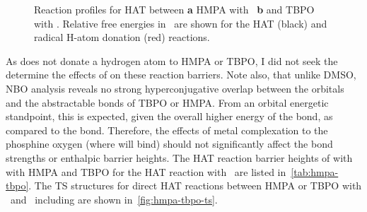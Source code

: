 \begin{figure}[!htbp]
  \setcounter{subfigure}{0}
  \centering

  \caption[Reaction profiles for HAT between HMPA with \bno\, and TBPO with
  \bno.]{Reaction profiles for HAT between \textbf{a} HMPA with \bno\,
  \textbf{b} and TBPO with \bno. Relative free energies in \kcalmol\ are shown
  for the HAT (black) and radical H-atom donation (red) reactions.}
  \label{fig:hmpa-tbpo-bno}
\end{figure}


As \bno does not donate a hydrogen atom to HMPA or TBPO, I did not seek the
determine the effects of  on these reaction barriers. Note also, that
unlike DMSO, NBO analysis reveals no strong hyperconjugative overlap between the
 orbitals and the abstractable  bonds of TBPO or HMPA. From an
orbital energetic standpoint, this is expected, given the overall higher energy
of the  bond, as compared to the  bond. Therefore, the effects
of metal complexation to the phosphine oxygen (where  will bind) should
not significantly affect the  bond strengths or enthalpic barrier
heights. The HAT reaction barrier heights of  with with HMPA and TBPO
for the HAT reaction with \cumo\ are listed in~\ref{tab:hmpa-tbpo}. The TS
structures for direct HAT reactions between HMPA or TBPO with \cumo\ and \bno\
including  are shown in~\ref{fig:hmpa-tbpo-ts}.


